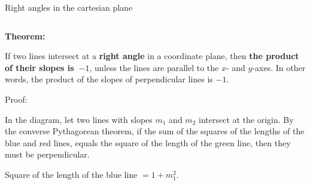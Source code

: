 \documentclass[9pt,aspectratio=169]{beamer}
\begin{document}
\begin{frame}{Right angles in the cartesian plane}
  \begin{columns}[T]
    \begin{column}{0.5\textwidth}
      \begin{definition}
        \textbf{Theorem:}
        
        If two lines intersect at a \textbf{right angle} in a coordinate plane, then \textbf{the product of their slopes is~$-1$}, unless the lines are parallel to the $x$- and $y$-axes.  In other words, the product of the slopes of perpendicular lines is $-1$.
      \end{definition}

      \begin{figure}
        \vspace*{-1em}
        \vspace*{-1em}
      \end{figure}

      Proof: 
      
      In the diagram, let two lines with slopes $m_1$ and $m_2$ intersect at the origin.  By the converse Pythagorean theorem, if the sum of the squares of the lengths of the blue and red lines, equals the square of the length of the green line, then they must be perpendicular.

      Square of the length of the blue line $= 1 + m_1^2$.
      

\end{column}
\end{columns}
\end{frame}
\end{document}
